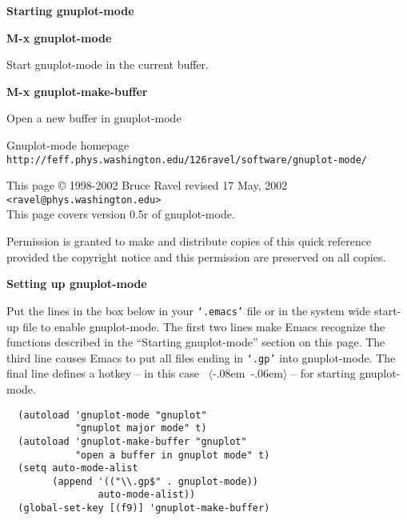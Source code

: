 \documentclass[twocolumn]{article}
\newenvironment{Boxedminipage}%
{\begin{Sbox}\begin{minipage}}%
  {\end{minipage}\end{Sbox}\Ovalbox{\TheSbox}}
\newenvironment{SqBoxedminipage}%
{\begin{Sbox}\begin{minipage}}%
  {\end{minipage}\end{Sbox}\fbox{\TheSbox}}
\def\version{{0.5r}}
\def\revised{{17 May, 2002}}
\def\file#1{{\texttt{`#1'}}}
\def\key#1{{\textrm \leavevmode\hbox{%
  \raise0.4pt\hbox{$\langle$}\kern-.08em\vtop{%
    \vbox{\hrule\kern-0.4pt
     \hbox{\raise0.4pt\hbox{\vphantom{$\langle$}}#1}}%
    \kern-0.4pt\hrule}%
  \kern-.06em\raise0.4pt\hbox{$\rangle$}}}}
\def\command#1#2{{
    \vspace{-0.2truecm}
    \begin{flushright}
      \begin{minipage}[h]{0.97\linewidth}
        \vspace{-0.2truecm}
        \textbf{#1}\hfill
        \begin{flushright}
          \begin{minipage}[h]{0.93\linewidth}
            \vspace{-0.4truecm}
            #2
          \end{minipage}
        \end{flushright}
      \end{minipage}
    \end{flushright}
    }}
\begin{document}
\vspace{4ex}

\centerline{{\large\textbf{Starting gnuplot-mode}}}
\vspace{2ex}

\command{M-x gnuplot-mode}{Start gnuplot-mode in the current buffer.}
%
\command{M-x gnuplot-make-buffer}{Open a new buffer in gnuplot-mode}



\vfill

\begin{Boxedminipage}{1.05\linewidth}
  \begin{center}
    \footnotesize{Gnuplot-mode homepage} \\
    \scriptsize{%
      \texttt{http://feff.phys.washington.edu/\char126ravel/software/gnuplot-mode/}}
  \end{center}
\end{Boxedminipage}
\begin{flushleft}
  {\footnotesize
    This page {\copyright} 1998-2002 Bruce Ravel \hfill revised \revised \\
    \texttt{<ravel@phys.washington.edu>} \\ %
    This page covers version {\version} of gnuplot-mode.

    Permission is granted to make and distribute copies of this quick
    reference provided the copyright notice and this permission are
    preserved on all copies.}
\end{flushleft}
\pagebreak
\centerline{{\large\textbf{Setting up gnuplot-mode}}}
\vspace{2ex}

Put the lines in the box below in your \file{.emacs} file or in the
system wide start-up file to enable gnuplot-mode.  The first two lines
make Emacs recognize the functions described in the ``Starting
gnuplot-mode'' section on this page.  The third line causes Emacs to
put all files ending in \file{.gp} into gnuplot-mode.  The final line
defines a hotkey -- in this case \key{F9} -- for starting
gnuplot-mode.

\begin{SqBoxedminipage}{\linewidth}
\begin{Verbatim}
  (autoload 'gnuplot-mode "gnuplot"
            "gnuplot major mode" t)
  (autoload 'gnuplot-make-buffer "gnuplot"
            "open a buffer in gnuplot mode" t)
  (setq auto-mode-alist
        (append '(("\\.gp$" . gnuplot-mode))
                auto-mode-alist))
  (global-set-key [(f9)] 'gnuplot-make-buffer)
\end{Verbatim}%
\end{SqBoxedminipage}
\end{document}
